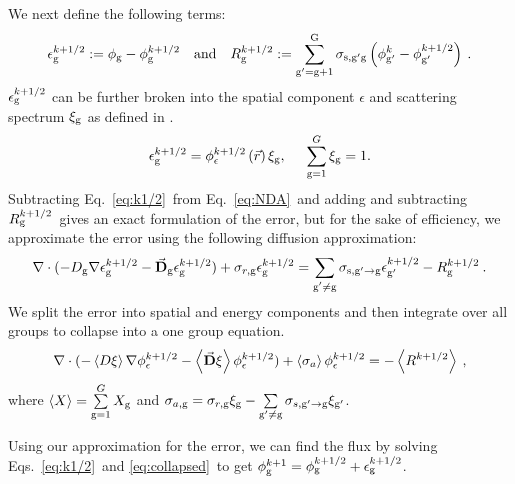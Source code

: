   We next define the following terms:
  \begin{equation}
  \epsilon_{\mathrm{g}}^{k+1/2} := \phi_{\mathrm{g}} - \phi_{\mathrm{g}}^{k + 1/2} \quad \mathrm{and} \quad R_{\mathrm{g}}^{k+1/2} := \sum\limits_{\mathrm{g}'=\mathrm{g}+1}^{\mathrm{G}} \sigma_{\mathrm{s},\mathrm{g}' \mathrm{g}}\left(\phi_{\mathrm{g}'}^k - \phi_{\mathrm{g}'}^{k + 1/2}\right)\:.
  \end{equation}
  $\epsilon_{\mathrm{g}}^{k + 1/2}$ can be further broken into the spatial component $\epsilon$ and scattering spectrum $\xi_{\mathrm{g}}$ as defined in \cite{morel-upscat,evans-upscat}.
  \begin{equation}
  \epsilon_{\mathrm{g}}^{k+1/2} = \phi_{\epsilon}^{k+1/2}\left(\vec{r}\right)\xi_{\mathrm{g}}, \hspace{5mm} \sum\limits_{\mathrm{g}=1}^G \xi_{\mathrm{g}} = 1.
  \end{equation}
  Subtracting Eq.\ \eqref{eq:k1/2}\ from Eq.\ \eqref{eq:NDA}\ and adding and subtracting $R_{\mathrm{g}}^{k+1/2}$\ gives an exact formulation of the error, but for the sake of efficiency, we approximate the error using the following diffusion approximation:
  \begin{equation}
  \nabla\cdot(-D_{\mathrm{g}}  \nabla \epsilon_{\mathrm{g}}^{k+1/2} - \vec{\bf D}_{\mathrm{g}}
  \epsilon_{\mathrm{g}}^{k+1/2}) + \sigma_{r,\mathrm{g}}  \epsilon_{\mathrm{g}}^{k+1/2} =  \sum\limits_{\substack{{\mathrm{g}'}\neq\mathrm{g}}} \sigma_{\mathrm{s},\mathrm{g}' \to\mathrm{g}}  \epsilon_{\mathrm{g}'}^{k+1/2} -  R^{k+1/2}_{\mathrm{g}} \:.
  \end{equation}
  We split the error into spatial and energy components and then integrate over all groups to collapse into a one group equation.
  \begin{equation}
  \nabla\cdot(-\left< D \xi \right> \nabla \phi_{\epsilon}^{k+1/2} - \left<\vec{\bf D} \xi
  \right> \phi_{\epsilon}^{k+1/2}) + \left< \sigma_{a} \right> \phi_{\epsilon}^{k+1/2} = - \left< R^{k+1/2} \right> \:,\label{eq:collapsed}
  \end{equation}
  where $\left< X \right> = \sum\limits_{\mathrm{g} = 1}^G X_{\mathrm{g}} $ and $\sigma_{a,\mathrm{g}}  = \sigma_{r,\mathrm{g}}\xi_{\mathrm{g}} - \sum\limits_{{\mathrm{g}'}\neq\mathrm{g}} \sigma_{s,\mathrm{g}'\rightarrow \mathrm{g}} \xi_{\mathrm{g}'}$.
  \par
  Using our approximation for the error, we can find the flux by solving Eqs.\ \eqref{eq:k1/2}\ and \eqref{eq:collapsed}\ to get $\phi_{\mathrm{g}}^{k+1} = \phi_{\mathrm{g}}^{k+1/2} + \epsilon_{\mathrm{g}}^{k+1/2}$.
